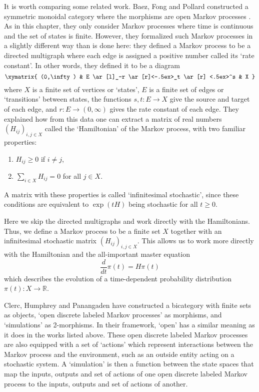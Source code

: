 \documentclass[oneside,final]{ucr}
\theoremstyle{definition}
\newcommand{\maps}{\colon}
\newcommand{\R}{\mathbb{R}}
\begin{document}
{It is worth comparing some related work.  Baez,  Fong and Pollard constructed a symmetric monoidal category where the morphisms are open Markov processes \cite{BFP,BP}. As in this chapter, they only consider Markov processes where time is continuous and the set of states is finite.  
However, they formalized such Markov processes in a slightly different way than is done here: they defined a Markov process to be a directed multigraph where each edge is assigned a positive number called its `rate constant'.   In other words, they defined it to be a diagram
\[ \xymatrix{ (0,\infty) & E \ar[l]_-r \ar[r]<-.5ex>_t  \ar[r] <.5ex>^s & X  }  \]
where $X$ is a finite set of vertices or `states', $E$ is a finite set of edges or `transitions' 
between states, the functions $s,t \maps E \to X$ give the source and target of each edge, and 
$r \maps E \to (0,\infty)$ gives the rate constant of each edge.   They explained how from this data
one can extract a matrix of real numbers $(H_{ij})_{i,j \in X}$ called the `Hamiltonian' of the Markov process, with two familiar properties:
\begin{enumerate}
\item $H_{ij} \geq 0$ if $i \neq j$, 
\item $\sum_{i \in X} H_{ij} = 0$ for all $j \in X$.
\end{enumerate}
A matrix with these properties is called `infinitesimal stochastic', since these conditions are equivalent to $\exp(tH)$ being stochastic for all $t \ge 0$.    

Here we skip the directed multigraphs and work directly with the Hamiltonians.  Thus, we define a Markov process to be a finite set $X$ together with an infinitesimal stochastic matrix $(H_{ij})_{i,j \in X}$.  This allows us to work more directly with the Hamiltonian and the all-important master equation
\[         \frac{d}{dt} \pi(t) = H \pi(t)  \]
which describes the evolution of a time-dependent probability distribution $\pi(t) \maps X \to \R$.

Clerc, Humphrey and Panangaden have constructed a bicategory \cite{Panan} with finite sets as objects, `open discrete labeled Markov processes' as morphisms, and `simulations' as 2-morphisms. In their framework, `open' has a similar meaning as it does in the works listed above.  These open discrete labeled Markov processes are also equipped with a set of `actions' which represent interactions between the Markov process and the environment, such as an outside entity acting on a stochastic system.   A `simulation' is then a function between the state spaces that map the inputs, outputs and set of actions of one open discrete labeled Markov process to the inputs, outputs and set of actions of another.   

}
\end{document}
